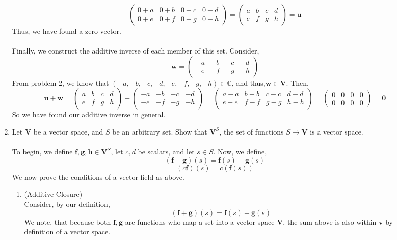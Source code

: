 \documentclass[letterpaper,10pt]{article}
\newcommand{\C}{\mathbb{C}}
\newcommand{\vect}[1]{\boldsymbol{#1}}
\begin{document}
\begin{description}
\begin{enumerate}
\[\begin{pmatrix}
0+a & 0+b & 0+c & 0+d \\
0+e & 0+f & 0+g & 0+h
\end{pmatrix}=\begin{pmatrix}
a & b & c & d \\
e & f & g & h
\end{pmatrix}=\vect{u}\]
Thus, we have found a zero vector.\\\\
Finally, we construct the additive inverse of each member of this set. Consider,
\[\vect{w}=\begin{pmatrix}
-a & -b & -c & -d \\
-e & -f & -g & -h
\end{pmatrix}\]
From problem 2, we know that $(-a,-b,-c,-d,-e,-f,-g,-h)\in\C$, and thus,$\vect{w}\in\vect{V}$. Then,
\[\vect{u}+\vect{w}=\begin{pmatrix}
a & b & c & d \\
e & f & g & h
\end{pmatrix}+\begin{pmatrix}
-a & -b & -c & -d \\
-e & -f & -g & -h
\end{pmatrix}=\begin{pmatrix}
a-a & b-b & c-c & d-d \\
e-e & f-f & g-g & h-h
\end{pmatrix}=\begin{pmatrix}
0 & 0 & 0 & 0 \\
0 & 0 & 0 & 0
\end{pmatrix}=\vect{0}\]
So we have found our additive inverse in general.
\addtocounter{enumi}{4}
\item Let $\vect{V}$ be a vector space, and $S$ be an arbitrary set. Show that $\vect{V}^S$, the set of functions $S\to\vect{V}$ is a vector space.
\\\\
To begin, we define $\vect{f},\vect{g},\vect{h}\in\vect{V}^S$, let $c,d$ be scalars, and let $s\in S$. Now, we define,
\[(\vect{f}+\vect{g})(s)=\vect{f}(s)+\vect{g}(s)\]
\[(c\vect{f})(s)=c(\vect{f}(s))\]
We now prove the conditions of a vector field as above.
\begin{enumerate}
\item (Additive Closure)\\
Consider, by our definition,
\[(\vect{f}+\vect{g})(s)=\vect{f}(s)+\vect{g}(s)\]
We note, that because both $\vect{f},\vect{g}$ are functions who map a set into a vector space $\vect{V}$, the sum above is also within $\vect{v}$ by definition of a vector space.

\end{enumerate}
\end{enumerate}
\end{description}
\end{document}
